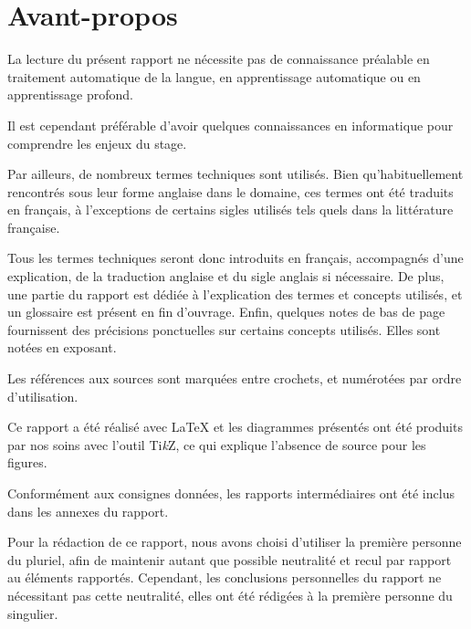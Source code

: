 \section*{Avant-propos} %
La lecture du présent rapport ne nécessite pas de connaissance préalable en traitement automatique de la langue, en apprentissage automatique ou en apprentissage profond.

Il est cependant préférable d'avoir quelques connaissances en informatique pour comprendre les enjeux du stage.

Par ailleurs, de nombreux termes techniques sont utilisés.
Bien qu'habituellement rencontrés sous leur forme anglaise dans le domaine, ces termes ont été traduits en français, à l'exceptions de certains sigles utilisés tels quels dans la littérature française.

Tous les termes techniques seront donc introduits en français, accompagnés d'une explication, de la traduction anglaise et du sigle anglais si nécessaire.
De plus, une partie du rapport est dédiée à l'explication des termes et concepts utilisés, et un glossaire est présent en fin d'ouvrage.
Enfin, quelques notes de bas de page fournissent des précisions ponctuelles sur certains concepts utilisés. Elles sont notées en exposant. 

Les références aux sources sont marquées entre crochets, et numérotées par ordre d'utilisation.

Ce rapport a été réalisé avec \LaTeX{} et les diagrammes présentés ont été produits par nos soins avec l'outil Ti\textit{k}Z, ce qui explique l'absence de source pour les figures.

Conformément aux consignes données, les rapports intermédiaires ont été inclus dans les annexes du rapport.

Pour la rédaction de ce rapport, nous avons choisi d'utiliser la première personne du pluriel, afin de maintenir autant que possible neutralité et recul par rapport au éléments rapportés. Cependant, les conclusions personnelles du rapport ne nécessitant pas cette neutralité, elles ont été rédigées à la première personne du singulier.

